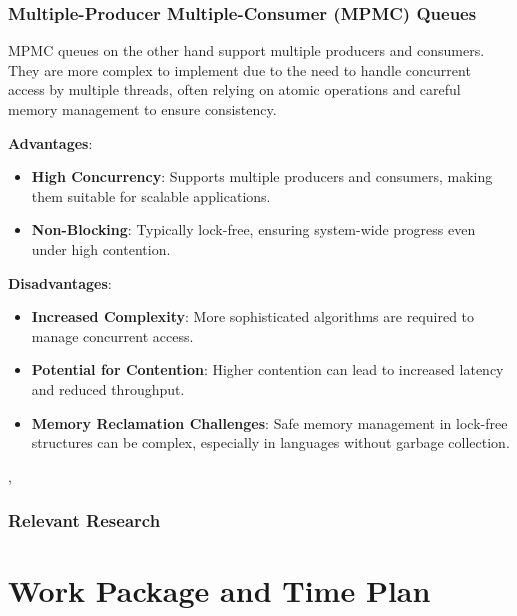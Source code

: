 \documentclass[ a4paper,
                toc=bibliography
              ]{scrartcl}
\begin{document}
\subsubsection{Multiple-Producer Multiple-Consumer (MPMC) Queues}

MPMC queues on the other hand support multiple producers and consumers. They are more complex to implement due to the need to handle concurrent access by multiple threads, often relying on atomic operations and careful memory management to ensure consistency.

\textbf{Advantages}:
\begin{itemize}
	\item \textbf{High Concurrency}: Supports multiple producers and consumers, making them suitable for scalable applications.
	\item \textbf{Non-Blocking}: Typically lock-free, ensuring system-wide progress even under high contention.
\end{itemize}


\textbf{Disadvantages}:
\begin{itemize}
	\item \textbf{Increased Complexity}: More sophisticated algorithms are required to manage concurrent access.
	\item \textbf{Potential for Contention}: Higher contention can lead to increased latency and reduced throughput.
	\item \textbf{Memory Reclamation Challenges}: Safe memory management in lock-free structures can be complex, especially in languages without garbage collection.
\end{itemize}
\cite{Gidenstam2010CacheAwareLockFreeQueues}, \cite{timnat2014practical}

\subsubsection{Relevant Research}

\section{Work Package and Time Plan}
\end{document}
